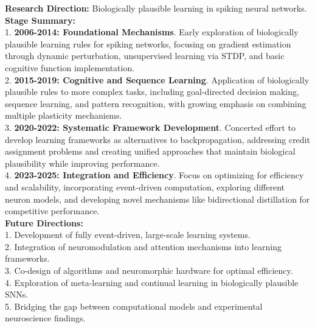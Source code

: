 \begin{tcolorbox}[breakable,colback=persona!20!white, colframe=persona!60!black, title=\textbf{An Example of Research Trend Predicting}]
    \label{box:trend}
    \textbf{Research Direction:} Biologically plausible learning in spiking neural networks.\\
    \textbf{Stage Summary:}\\
    1. \textbf{2006-2014: Foundational Mechanisms}. Early exploration of biologically plausible learning rules for spiking networks, focusing on gradient estimation through dynamic perturbation, unsupervised learning via STDP, and basic cognitive function implementation.\\
    2. \textbf{2015-2019: Cognitive and Sequence Learning}. Application of biologically plausible rules to more complex tasks, including goal-directed decision making, sequence learning, and pattern recognition, with growing emphasis on combining multiple plasticity mechanisms.\\
    3. \textbf{2020-2022: Systematic Framework Development}. Concerted effort to develop learning frameworks as alternatives to backpropagation, addressing credit assignment problems and creating unified approaches that maintain biological plausibility while improving performance.\\
    4. \textbf{2023-2025: Integration and Efficiency}. Focus on optimizing for efficiency and scalability, incorporating event-driven computation, exploring different neuron models, and developing novel mechanisms like bidirectional distillation for competitive performance.\\
    \textbf{Future Directions:}\\
    1. Development of fully event-driven, large-scale learning systems.\\
    2. Integration of neuromodulation and attention mechanisms into learning frameworks.\\
    3. Co-design of algorithms and neuromorphic hardware for optimal efficiency.\\
    4. Exploration of meta-learning and continual learning in biologically plausible SNNs.\\
    5. Bridging the gap between computational models and experimental neuroscience findings.
\end{tcolorbox}


